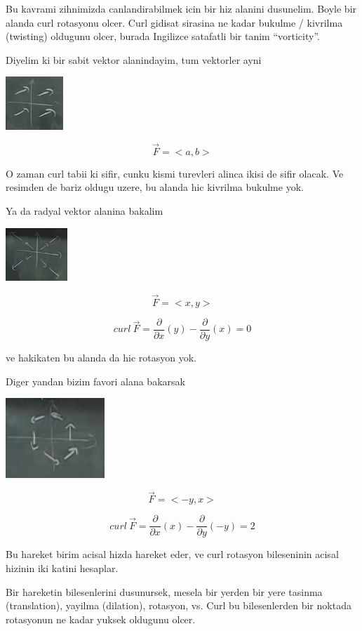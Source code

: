 \documentclass[12pt,fleqn]{article}
\begin{document}
Bu kavrami zihnimizda canlandirabilmek icin bir hiz alanini
dusunelim. Boyle bir alanda curl rotasyonu olcer. Curl gidisat sirasina ne
kadar bukulme /  kivrilma (twisting) oldugunu olcer, burada Ingilizce satafatli bir
tanim ``vorticity''. 

Diyelim ki bir sabit vektor alanindayim, tum vektorler ayni

\includegraphics[height=2cm]{21_5.png}

\[ \vec{F} = <a,b> \]

O zaman curl tabii ki sifir, cunku kismi turevleri alinca ikisi de sifir
olacak. Ve resimden de bariz oldugu uzere, bu alanda hic kivrilma bukulme
yok. 

Ya da radyal vektor alanina bakalim

\includegraphics[height=2cm]{21_6.png}

\[ \vec{F}= <x,y> \]

\[ curl \ \vec{F} = \frac{\partial }{\partial x}(y) -
 \frac{\partial }{\partial y}(x) = 0
 \]

ve hakikaten bu alanda da hic rotasyon yok. 

Diger yandan bizim favori alana bakarsak

\includegraphics[height=3cm]{21_1.png}

\[ \vec{F} = <-y,x> \]

\[ curl \ \vec{F} = \frac{\partial }{\partial x}(x) -
 \frac{\partial }{\partial y}(-y) = 2
 \]

Bu hareket birim acisal hizda hareket eder, ve curl rotasyon bileseninin
acisal hizinin iki katini hesaplar.

Bir hareketin bilesenlerini dusunursek, mesela bir yerden bir yere tasinma
(translation), yayilma (dilation), rotasyon, vs. Curl bu bilesenlerden
bir noktada rotasyonun ne kadar yuksek oldugunu olcer. 
\end{document}
